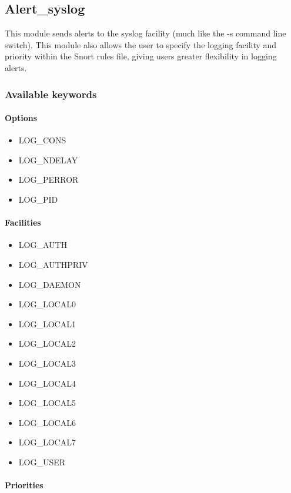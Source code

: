 \documentclass[english]{report}
\begin{document}
\subsection{Alert\_syslog \label{alert syslog lable}}

This module sends alerts to the syslog facility (much like the -s
command line switch). This module also allows the user to specify
the logging facility and priority within the Snort rules file, giving
users greater flexibility in logging alerts.

\subsubsection{Available keywords }


\paragraph{Options}

\begin{itemize}
\item LOG\_CONS 
\item LOG\_NDELAY 
\item LOG\_PERROR
\item LOG\_PID
\end{itemize}

\paragraph{Facilities }

\begin{itemize}
\item LOG\_AUTH 
\item LOG\_AUTHPRIV 
\item LOG\_DAEMON 
\item LOG\_LOCAL0 
\item LOG\_LOCAL1 
\item LOG\_LOCAL2 
\item LOG\_LOCAL3 
\item LOG\_LOCAL4 
\item LOG\_LOCAL5 
\item LOG\_LOCAL6 
\item LOG\_LOCAL7 
\item LOG\_USER
\end{itemize}

\paragraph{Priorities }
\end{document}
